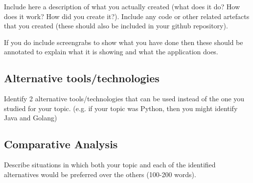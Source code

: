 \documentclass[a4paper, 11pt]{report}
\begin{document}
Include here a description of what you actually created (what does it do? How does it work? How did you create it?). Include any code or other related artefacts that you created (these should also be included in your github repository).

If you do include screengrabs to show what you have done then these should be annotated to explain what it is showing and what the application does.

\subsection{Alternative tools/technologies}
Identify 2 alternative tools/technologies that can be used instead of the one you studied for your topic. (e.g. if your topic was Python, then you might identify Java and Golang)
\subsection{Comparative Analysis}
Describe situations in which both your topic and each of the identified alternatives would be preferred over the others (100-200 words).




\newpage



\end{document}
